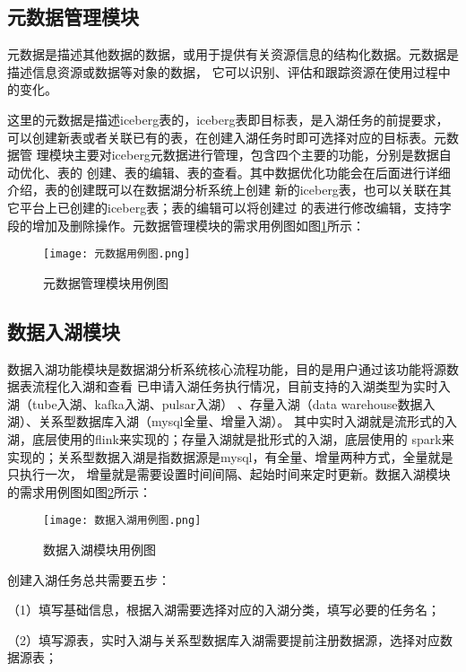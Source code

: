 \subsection{元数据管理模块}

元数据是描述其他数据的数据，或用于提供有关资源信息的结构化数据。元数据是描述信息资源或数据等对象的数据，
它可以识别、评估和跟踪资源在使用过程中的变化\cite{15}。

这里的元数据是描述iceberg表的，iceberg表即目标表，是入湖任务的前提要求，
可以创建新表或者关联已有的表，在创建入湖任务时即可选择对应的目标表。元数据管
理模块主要对iceberg元数据进行管理，包含四个主要的功能，分别是数据自动优化、表的
创建、表的编辑、表的查看。其中数据优化功能会在后面进行详细介绍，表的创建既可以在数据湖分析系统上创建
新的iceberg表，也可以关联在其它平台上已创建的iceberg表；表的编辑可以将创建过
的表进行修改编辑，支持字段的增加及删除操作。元数据管理模块的需求用例图如图\ref{fig:元数据用例图}所示：

\begin{figure}[H]
  \centering
  \texttt{[image: 元数据用例图.png]}
  \caption{元数据管理模块用例图}
  \label{fig:元数据用例图}
\end{figure}

\subsection{数据入湖模块}

数据入湖功能模块是数据湖分析系统核心流程功能，目的是用户通过该功能将源数据表流程化入湖和查看
已申请入湖任务执行情况，目前支持的入湖类型为实时入湖（tube入湖、kafka入湖、pulsar入湖）
、存量入湖（data warehouse数据入湖）、关系型数据库入湖（mysql全量、增量入湖）。
其中实时入湖就是流形式的入湖，底层使用的flink来实现的；存量入湖就是批形式的入湖，底层使用的
spark来实现的；关系型数据入湖是指数据源是mysql，有全量、增量两种方式，全量就是只执行一次，
增量就是需要设置时间间隔、起始时间来定时更新。数据入湖模块的需求用例图如图\ref{fig:数据入湖用例图}所示：

\begin{figure}[H]
  \centering
  \texttt{[image: 数据入湖用例图.png]}
  \caption{数据入湖模块用例图}
  \label{fig:数据入湖用例图}
\end{figure}

创建入湖任务总共需要五步：

（1）填写基础信息，根据入湖需要选择对应的入湖分类，填写必要的任务名；

（2）填写源表，实时入湖与关系型数据库入湖需要提前注册数据源，选择对应数据源表；

